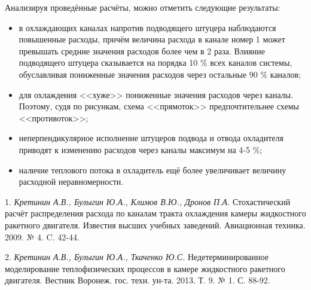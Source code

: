 Анализируя проведённые расчёты, можно отметить следующие результаты:
\begin{itemize}
	\item
	в охлаждающих каналах напротив подводящего штуцера наблюдаются повышенные расходы, причём величина расхода в канале номер 1 может превышать средние значения расходов более чем в 2 раза. Влияние подводящего штуцера сказывается на порядка 10 $\%$ всех каналов системы, обуславливая пониженные значения расходов через остальные 90 $\%$ каналов;

	\item
	для охлаждения <<хуже>> пониженные значения расходов через каналы. Поэтому, судя по рисункам, схема <<прямоток>> предпочтительнее схемы <<противоток>>;

	\item
	неперпендикулярное исполнение штуцеров подвода и отвода охладителя приводят к изменению расходов через каналы максимум на 4-5 $\%$;

	\item
	наличие теплового потока в охладитель ещё более увеличивает величину расходной неравномерности.
\end{itemize}

\litlist

1. {\it Кретинин А.В., Булыгин Ю.А., Климов В.Ю., Дронов П.А.} Стохастический расчёт распределения расхода по каналам тракта охлаждения камеры жидкостного ракетного двигателя. Известия высших учебных заведений. Авиационная техника. 2009. № 4. C. 42-44.

2. {\it Кретинин А.В., Булыгин Ю.А., Ткаченко Ю.С.} Недетерминированное моделирование теплофизических процессов в камере жидкостного ракетного двигателя. Вестник Воронеж. гос. техн. ун-та. 2013. Т. 9. № 1. С. 88-92.
